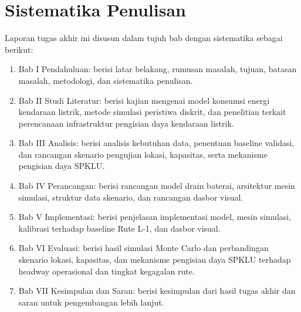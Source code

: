 \section{Sistematika Penulisan}

Laporan tugas akhir ini disusun dalam tujuh bab dengan sistematika sebagai
berikut:
\begin{enumerate}
	\item Bab I Pendahuluan: berisi latar belakang, rumusan masalah, tujuan,
	batasan masalah, metodologi, dan sistematika penulisan.
	\item Bab II Studi Literatur: berisi kajian mengenai model konsumsi energi
	kendaraan listrik, metode simulasi peristiwa diskrit, dan penelitian
	terkait perencanaan infrastruktur pengisian daya kendaraan listrik.
	\item Bab III Analisis: berisi analisis kebutuhan data, penentuan baseline
	validasi, dan rancangan skenario pengujian lokasi, kapasitas, serta
	mekanisme pengisian daya SPKLU.
	\item Bab IV Perancangan: berisi rancangan model drain baterai, arsitektur
	mesin simulasi, struktur data skenario, dan rancangan dasbor visual.
	\item Bab V Implementasi: berisi penjelasan implementasi model, mesin
	simulasi, kalibrasi terhadap baseline Rute L-1, dan dasbor visual.
	\item Bab VI Evaluasi: berisi hasil simulasi Monte Carlo dan perbandingan
	skenario lokasi, kapasitas, dan mekanisme pengisian daya SPKLU terhadap
	headway operasional dan tingkat kegagalan rute.
	\item Bab VII Kesimpulan dan Saran: berisi kesimpulan dari hasil tugas akhir
	dan saran untuk pengembangan lebih lanjut.
\end{enumerate}